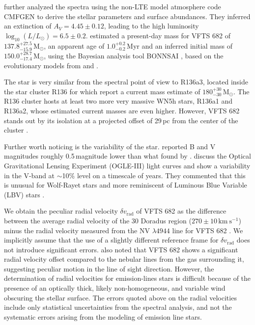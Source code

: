 \documentclass[apjl,twocolumn]{emulateapj}
\newcommand{\kms}{{\,\mathrm{km\ s^{-1}}}}
\newcommand{\Msun}{{\,\mathrm{M}_\odot}}
\begin{document}
\citet{bestenlehner:11} further analyzed the spectra using the non-LTE
model atmosphere code CMFGEN \citep{hillier:98} to derive the stellar
parameters and surface abundances. They inferred an extinction
of $A_V=4.45\pm0.12$, leading to the high luminosity
$\log_{10}(L/L_\odot) =  6.5\pm0.2$. \citet{schneider:18} estimated
a present-day mass for VFTS 682 of $137.8^{+27.5}_ {-15.9}\Msun$, an
apparent age of $1.0^{+0.2}_{-0.2}$\,Myr and an inferred initial mass
of $150.0^{+28.7}_{-17.4}\Msun$, using the Bayesian analysis tool BONNSAI
\citep{schneider:17}, based on the evolutionary models from
\citet{brott:11} and \cite{kohler:15}. %

The star is very similar from the spectral point of view to R136a3, located inside the star cluster
R136 \citep{crowther:10}  for which \citet{crowther:16} report a
current mass estimate of $180^{+30}_{-30}\Msun$. The R136 cluster hosts
at least two more very massive WN5h stars, R136a1 and R136a2, whose
estimated current masses are even higher. However, VFTS 682 stands
out by its isolation at a projected offset of 29\,pc from the center
of the cluster \citep{bestenlehner:11}. 

Further worth noticing is the variability of the
star. \citet{parker:93} reported B and V magnitudes roughly 0.5\,magnitude
lower than what found by \citet{evans:11}. \citet{bestenlehner:11} discuss the Optical Gravitational Lensing
Experiment (OGLE-III) light curves \citep{udalski:08} and show a
variability in the V-band at $\sim$10\% level on a timescale of years.
They commented that this is unusual for Wolf-Rayet stars and more reminiscent
of Luminous Blue Variable (LBV) stars \citep[e.g.,][]{langer:94}. 

We obtain the peculiar radial velocity $\delta v_\mathrm{rad}$ of VFTS 682 as the difference
between the average radial velocity of the 30 Doradus region
($270\pm10\kms$) minus the radial velocity measured from the NV $\lambda4944$
line for VFTS 682  \citep[$300\pm10\kms$, ][]{bestenlehner:11}. We implicitly assume that the use
of a slightly different reference frame for $\delta v_\mathrm{rad}$ does not
introduce significant errors. \cite{bressert:12} also noted that VFTS
682 shows a significant radial velocity offset compared to the nebular
lines from the gas surrounding it, suggesting peculiar motion in the
line of sight direction. However, the determination of
radial velocities for emission-lines stars is difficult because of the
presence of an optically thick, likely non-homogeneous, and variable
wind obscuring the stellar surface. The errors quoted above on the
radial velocities include only statistical uncertainties from the
spectral analysis, and not the systematic errors arising from the
modeling of emission line stars.
\end{document}
